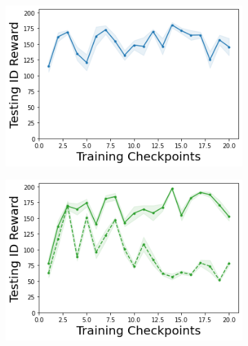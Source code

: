 \begin{figure}
\begin{subfigure}{.245\textwidth}
    \end{subfigure}
    \begin{subfigure}{.245\textwidth}
        \includegraphics[width=\textwidth]{sections/011_icml2022/resources/DKL-CartPole-v0-mean_reward_-testing-strategy.png}
    \end{subfigure}
    \begin{subfigure}{.245\textwidth}
        \includegraphics[width=\textwidth]{sections/011_icml2022/resources/PostNet-CartPole-v0-mean_reward_-testing-strategy.png}
    \end{subfigure}
    

\end{figure}
